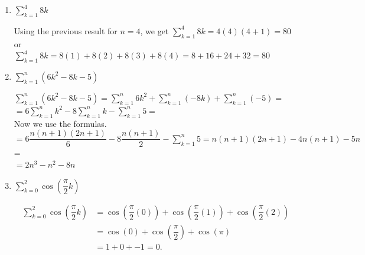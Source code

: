 \documentclass{ximera}
\begin{document}
\begin{problem}
\begin{enumerate}
	\item  $\displaystyle \sum_{k=1}^{4}8k$
		\begin{explanation}
			Using the previous result for $n=4$, we get
			  $\displaystyle \sum_{k=1}^{4}8k=4(4)(4+1)=80$\\
			  or\\
			  $\displaystyle \sum_{k=1}^{4}8k=8(1)+8(2)+8(3)+8(4)=8+16+24+32=80$
		\end{explanation}	
\item  $\displaystyle \sum_{k=1}^{n}(6k^2-8k-5)$	
		\begin{explanation}
			$\displaystyle \sum_{k=1}^{n}(6k^2-8k-5)=\displaystyle \sum_{k=1}^{n}6k^2+\displaystyle \sum_{k=1}^{n}(-8k)+\displaystyle \sum_{k=1}^{n}(-5)=$\\
			$=6\displaystyle \sum_{k=1}^{n}k^2-8\displaystyle \sum_{k=1}^{n}k-\displaystyle \sum_{k=1}^{n}5=$ \\
			Now we use the formulas.\\[1em]
			$=6\dfrac{n(n+1)(2n+1)}{6}-8\dfrac{n(n+1)}{2}-\displaystyle \sum_{k=1}^{n}5=n(n+1)(2n+1)-4n(n+1)-5n$=\\[1em]
			$=2n^3-n^2-8n$
		\end{explanation}	
\item  $\displaystyle \sum_{k=0}^{2} \cos\left( \dfrac{\pi}{2}k\right)$
		\begin{explanation}
		\begin{align*}
			\displaystyle \sum_{k=0}^{2} \cos\left( \dfrac{\pi}{2}k\right) &= \cos\left( \dfrac{\pi}{2}(0)\right) + \cos\left( \dfrac{\pi}{2}(1)\right) + \cos\left( \dfrac{\pi}{2}(2)\right)\\
			&= \cos\left( 0\right) + \cos\left( \dfrac{\pi}{2}\right) + \cos\left( \pi\right) \\
			&= 1 + 0 + -1 = 0.
		\end{align*}
		\end{explanation}
\end{enumerate}
\end{problem}
\end{document}
